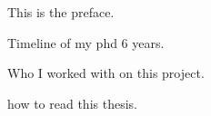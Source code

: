\preface

This is the preface.

Timeline of my phd 6 years.

Who I worked with on this project.

how to read this thesis.


